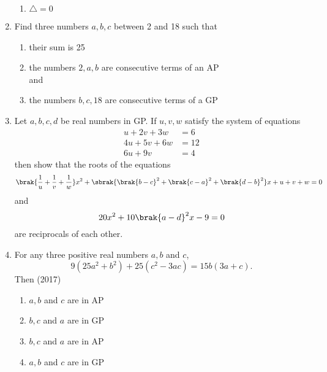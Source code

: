 \begin{enumerate}[label=\thesubsection.\arabic*,ref=\thesubsection.\theenumi]
\begin{multicols}{4}
\begin{enumerate}
                    \item $\triangle=0$
                \end{enumerate}
                \end{multicols}
    \item Find three numbers $a, b, c$ between 2 and 18 such that
\begin{enumerate}    
    \item their sum is 25
    \item the numbers $2, a, b$ are consecutive terms of an AP
    \\
    and
    \item the numbers $b, c, 18$ are consecutive terms of a GP\hfill{}
    \end{enumerate}
%  
      \item  Let $ a, b, c, d $ be real numbers in GP. If $u, v, w$ satisfy the system of equations  
%    
	      \hfill {}
%      
\begin{align*}
	u+2v+3w&=6  
	  \\
	  4u+5v+6w&=12 
	  \\
	  6u+9v&=4 
\end{align*}
      then show that the roots of the equations 
		$$\brak{\frac{1}{u}+\frac{1}{v}+\frac{1}{w}}x^{2}+\sbrak{\brak{b-c}^{2}+\brak{c-a}^{2}+\brak{d-b}^{2}}x+u+v+w=0 $$ and $$ 20x^{2}+10\brak{a-d}^{2}x-9=0 $$ are reciprocals of each other.
 \item For any three positive real numbers $a, b$ and $c$,  $$9(25a^2+b^2)+ 25(c^2-3ac) = 15b(3a+c).$$ Then \hfill (2017)
	 \begin{multicols}{2}
\begin{enumerate}    
  \item$a, b$ and $c$ are in AP
  \item{$b, c$ and $a$ are in GP}
  \columnbreak
  \item $b, c$ and $a$ are in AP
  \item{$a, b$ and $c$ are in GP}
  \end{enumerate}
  \end{multicols}
\end{enumerate}
